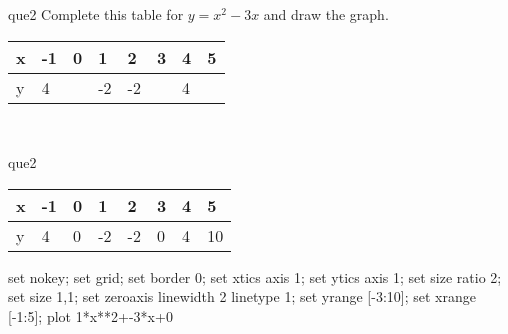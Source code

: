 \documentclass[13.5pt, varwidth=true]{beamer}
\begin{document}
\begin{frame}[shrink=19,fragile]
	\begin{beamercolorbox}[rounded=true, left, shadow=true,wd=14.8cm]{que2}
		 Complete this table for $y = x^{2} - 3x$ and draw the graph. \\[0.3cm] \renewcommand{\arraystretch}{1.2}\begin{tabular}{|C|C|C|C|C|C|C|C|} \hline x & -1 & 0 & 1 & 2 & 3 & 4 & 5 \\ \hline y & 4 &  & -2 & -2 &  & 4 & \\ \hline \end{tabular}\\[0.3cm]
	\end{beamercolorbox}
\end{frame}
\begin{frame}[shrink=19,fragile]
	\begin{beamercolorbox}[rounded=true, left, shadow=true,wd=14.8cm]{que2}
		\renewcommand{\arraystretch}{1.2}\begin{tabular}{|C|C|C|C|C|C|C|C|} \hline x & -1 & 0 & 1 & 2 & 3 & 4 & 5 \\ \hline y & 4 & 0 & -2 & -2 & 0 & 4 & 10\\ \hline \end{tabular}\begin{gnuplot}[terminal=pdf] set nokey; set grid; set border 0; set xtics axis 1; set ytics axis 1; set size ratio 2; set size 1,1; set zeroaxis linewidth 2 linetype 1; set yrange [-3:10]; set xrange [-1:5]; plot 1*x**2+-3*x+0 \end{gnuplot}
	\end{beamercolorbox}
\end{frame}
\end{document}
